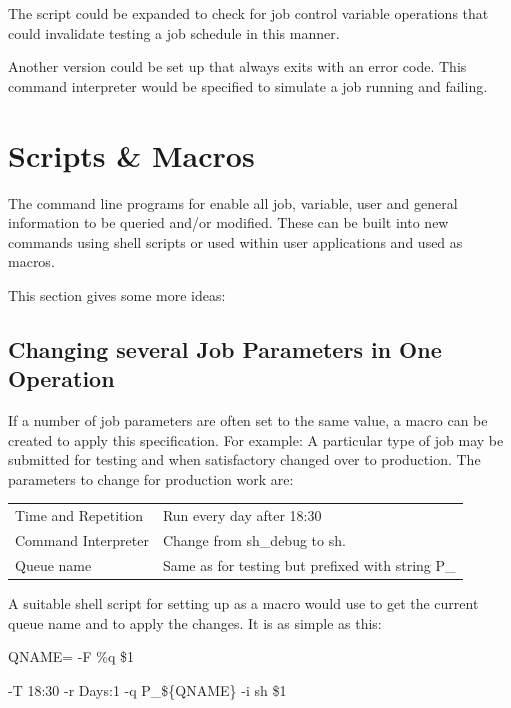 The script could be expanded to check for job control variable operations that could invalidate testing a job schedule in this manner.

Another version could be set up that always exits with an error code. This command interpreter would be specified to simulate a job running
and failing.

\section{Scripts \& Macros}
The command line programs for \ProductName{} enable all job, variable, user and general information to be queried and/or modified. These can be built into new commands using shell scripts or used within user applications and used as macros.

This section gives some more ideas:

\subsection{Changing several Job Parameters in One Operation}
If a number of job parameters are often set to the same value, a macro can be created to apply this specification. For example: A particular type of job may be submitted for testing and when satisfactory changed over to production. The parameters to change for production work are:

\hspace{2cm}
\begin{tabular}{l l}
Time and Repetition & Run every day after 18:30\\
Command Interpreter & Change from sh\_debug to sh.\\
Queue name & Same as for testing but prefixed with string P\_\\
\end{tabular}

A suitable shell script for setting up as a macro would use \PrBtjlist{} to get the current queue name and
\PrBtjchange{} to apply the changes. It is as simple as this:

\begin{expara}

QNAME={\textasciigrave}\BtjlistName{} -F {\textquotedbl}\%q{\textquotedbl} \$1{\textasciigrave}

\BtjchangeName{} -T 18:30 -r Days:1 -q P\_\$\{QNAME\} -i sh \$1

\end{expara}

